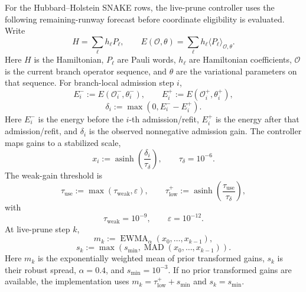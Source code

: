 \documentclass[
  reprint,
  amsmath,
  amssymb,
  aps,
  pra,
  nofootinbib,
  superscriptaddress,
  floatfix
]{revtex4-2}
\begin{document}
For the Hubbard--Holstein SNAKE rows, the live-prune controller uses the following remaining-runway forecast before coordinate eligibility is evaluated.  Write
\[
H=\sum_{\ell}h_{\ell}P_{\ell},
\qquad
E(\mathcal O,\theta)
=
\sum_{\ell}h_{\ell}
\langle P_{\ell}\rangle_{\mathcal O,\theta}.
\]
Here \(H\) is the Hamiltonian, \(P_{\ell}\) are Pauli words, \(h_{\ell}\) are Hamiltonian coefficients, \(\mathcal O\) is the current branch operator sequence, and \(\theta\) are the variational parameters on that sequence.  For branch-local admission step \(i\),
\[
E_i^{-}:=E(\mathcal O_i^{-},\theta_i^{-}),
\qquad
E_i^{+}:=E(\mathcal O_i^{+},\theta_i^{+}),
\]
\[
\delta_i:=\max(0,E_i^{-}-E_i^{+}).
\]
Here \(E_i^{-}\) is the energy before the \(i\)-th admission/refit, \(E_i^{+}\) is the energy after that admission/refit, and \(\delta_i\) is the observed nonnegative admission gain.  The controller maps gains to a stabilized scale,
\[
x_i:=\operatorname{asinh}\!\left(\frac{\delta_i}{\tau_\delta}\right),
\qquad
\tau_\delta=10^{-6}.
\]
The weak-gain threshold is
\[
\tau_{\mathrm{use}}:=\max(\tau_{\mathrm{weak}},\varepsilon),
\qquad
\tau_{\mathrm{low}}^{+}
:=
\operatorname{asinh}\!\left(\frac{\tau_{\mathrm{use}}}{\tau_\delta}\right),
\]
with
\[
\tau_{\mathrm{weak}}=10^{-9},
\qquad
\varepsilon=10^{-12}.
\]
At live-prune step \(k\),
\[
m_k:=\operatorname{EWMA}_{\alpha}(x_0,\ldots,x_{k-1}),
\]
\[
s_k:=\max\!\left(
s_{\min},\operatorname{MAD}(x_0,\ldots,x_{k-1})
\right).
\]
Here \(m_k\) is the exponentially weighted mean of prior transformed gains, \(s_k\) is their robust spread, \(\alpha=0.4\), and \(s_{\min}=10^{-3}\).  If no prior transformed gains are available, the implementation uses \(m_k=\tau_{\mathrm{low}}^{+}+s_{\min}\) and \(s_k=s_{\min}\).
\end{document}

